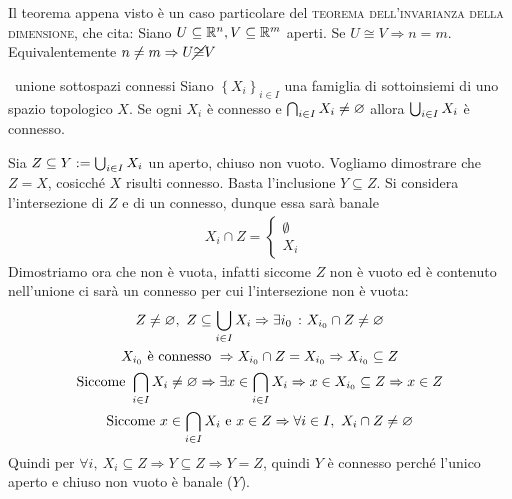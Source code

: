 \begin{observe}
	Il teorema appena visto è un caso particolare del \textsc{teorema dell'invarianza della dimensione}, che cita: \newline
	Siano $U\subseteq\mathbb{R}^n, V\subseteq\mathbb{R}^m$ aperti. Se $U\cong V \Rightarrow n=m$. Equivalentemente $n\neq m\Rightarrow U\cancel\cong V$
\end{observe}

\begin{theorema}~{unione sottospazi connessi}
	Siano $\left\{ X_i \right\}_{i\in I}$ una famiglia di sottoinsiemi di uno spazio topologico $X$. Se ogni $X_i$ è connesso e $\mathop{{\bigcap}}\displaylimits_{i\in I}X_i\neq\varnothing$ allora $\mathop{{\bigcup}}\displaylimits_{i\in I}X_i$ è connesso.	
\end{theorema}
\begin{demonstration}
	Sia $Z\subseteq Y:= \mathop{{\bigcup}}\displaylimits_{i\in I}X_i$ un aperto, chiuso non vuoto. Vogliamo dimostrare che $Z=X$, cosicché $X$ risulti connesso. Basta l'inclusione $Y\subseteq Z$.\newline
	Si considera l'intersezione di $Z$ e di un connesso, dunque essa sarà banale
	\begin{gather*}
		X_i \cap Z = \begin{cases}
			\emptyset & \\
			X_i	&		
		\end{cases}
	\end{gather*}
	Dimostriamo ora che non è vuota, infatti siccome $Z$ non è vuoto ed è contenuto nell'unione ci sarà un connesso per cui l'intersezione non è vuota:
		\begin{gather*}
			Z\neq\emptyset, \ Z\subseteq \union_{i\in I}X_i \Rightarrow \exists i_0 \ \colon X_{i_0}\cap Z\neq \emptyset	\\
			\text{$X_{i_0}$ è connesso } \Rightarrow X_{i_0}\cap Z=X_{i_0} \Rightarrow X_{i_0}\subseteq Z \\
			\text{Siccome } \inter_{i\in I}X_i\neq\emptyset \Rightarrow \exists x\in\inter_{i\in I}X_i \Rightarrow x\in X_{i_0}\subseteq Z \Rightarrow x\in Z	\\
			\text{Siccome } x\in\inter_{i\in I}X_i$ e $x\in Z \Rightarrow \forall i\in I, \ X_i\cap Z\neq\emptyset
		\end{gather*}
	Quindi per $\forall i, \ X_i\subseteq Z \Rightarrow Y\subseteq Z \Rightarrow Y=Z$, quindi $Y$ è connesso perché l'unico aperto e chiuso non vuoto è banale ($Y$).
\end{demonstration}

